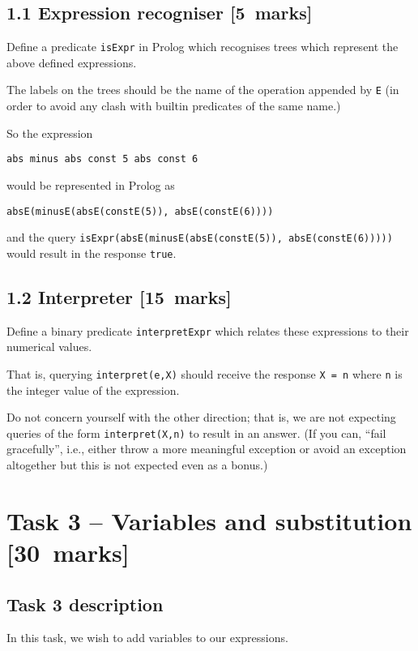 \documentclass[11pt]{article}
\begin{document}
\subsection*{1.1 Expression recogniser [5 marks]}
\label{sec:org24761f4}
Define a predicate \texttt{isExpr} in Prolog which recognises
trees which represent the above defined expressions.

The labels on the trees should be the name of the operation
appended by \texttt{E} (in order to avoid any clash with builtin predicates
of the same name.)

So the expression
\begin{verbatim}
abs minus abs const 5 abs const 6
\end{verbatim}
would be represented in Prolog as
\begin{verbatim}
absE(minusE(absE(constE(5)), absE(constE(6))))
\end{verbatim}
and the query \texttt{isExpr(absE(minusE(absE(constE(5)), absE(constE(6)))))} would
result in the response \texttt{true}.

\subsection*{1.2 Interpreter           [15 marks]}
\label{sec:org250da4d}

Define a binary predicate \texttt{interpretExpr} which
relates these expressions to their numerical values.

That is, querying \texttt{interpret(e,X)} should
receive the response \texttt{X = n} where \texttt{n} is
the integer value of the expression.

Do not concern yourself with the other direction;
that is, we are not expecting queries
of the form \texttt{interpret(X,n)} to result in an answer.
(If you can, “fail gracefully”,
i.e., either throw a more meaningful exception
or avoid an exception altogether
but this is not expected even as a bonus.)

\section*{Task 3 – Variables and substitution    [30 marks]}
\label{sec:orgec36fc7}
\subsection*{Task 3 description}
\label{sec:org06989a9}
In this task, we wish to add variables to our expressions.
\end{document}
